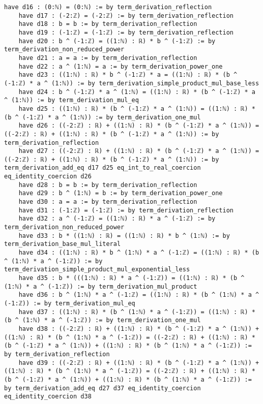 \documentclass{article}
\begin{document}
\begin{tcolorbox}[colback=white!10, width=\linewidth]
\begin{lstlisting}[language=Lean4]
    have d16 : (0:ℕ) = (0:ℕ) := by term_derivation_reflection
    have d17 : (-2:ℤ) = (-2:ℤ) := by term_derivation_reflection
    have d18 : b = b := by term_derivation_reflection
    have d19 : (-1:ℤ) = (-1:ℤ) := by term_derivation_reflection
    have d20 : b ^ (-1:ℤ) = ((1:ℕ) : ℝ) * b ^ (-1:ℤ) := by term_derivation_non_reduced_power
    have d21 : a = a := by term_derivation_reflection
    have d22 : a ^ (1:ℕ) = a := by term_derivation_power_one
    have d23 : ((1:ℕ) : ℝ) * b ^ (-1:ℤ) * a = ((1:ℕ) : ℝ) * (b ^ (-1:ℤ) * a ^ (1:ℕ)) := by term_derivation_simple_product_mul_base_less
    have d24 : b ^ (-1:ℤ) * a ^ (1:ℕ) = ((1:ℕ) : ℝ) * (b ^ (-1:ℤ) * a ^ (1:ℕ)) := by term_derivation_mul_eq
    have d25 : ((1:ℕ) : ℝ) * (b ^ (-1:ℤ) * a ^ (1:ℕ)) = ((1:ℕ) : ℝ) * (b ^ (-1:ℤ) * a ^ (1:ℕ)) := by term_derivation_one_mul
    have d26 : ((-2:ℤ) : ℝ) + ((1:ℕ) : ℝ) * (b ^ (-1:ℤ) * a ^ (1:ℕ)) = ((-2:ℤ) : ℝ) + ((1:ℕ) : ℝ) * (b ^ (-1:ℤ) * a ^ (1:ℕ)) := by term_derivation_reflection
    have d27 : ((-2:ℤ) : ℝ) + ((1:ℕ) : ℝ) * (b ^ (-1:ℤ) * a ^ (1:ℕ)) = ((-2:ℤ) : ℝ) + ((1:ℕ) : ℝ) * (b ^ (-1:ℤ) * a ^ (1:ℕ)) := by term_derivation_add_eq d17 d25 eq_int_to_real_coercion eq_identity_coercion d26
    have d28 : b = b := by term_derivation_reflection
    have d29 : b ^ (1:ℕ) = b := by term_derivation_power_one
    have d30 : a = a := by term_derivation_reflection
    have d31 : (-1:ℤ) = (-1:ℤ) := by term_derivation_reflection
    have d32 : a ^ (-1:ℤ) = ((1:ℕ) : ℝ) * a ^ (-1:ℤ) := by term_derivation_non_reduced_power
    have d33 : b * ((1:ℕ) : ℝ) = ((1:ℕ) : ℝ) * b ^ (1:ℕ) := by term_derivation_base_mul_literal
    have d34 : ((1:ℕ) : ℝ) * b ^ (1:ℕ) * a ^ (-1:ℤ) = ((1:ℕ) : ℝ) * (b ^ (1:ℕ) * a ^ (-1:ℤ)) := by term_derivation_simple_product_mul_exponential_less
    have d35 : b * (((1:ℕ) : ℝ) * a ^ (-1:ℤ)) = ((1:ℕ) : ℝ) * (b ^ (1:ℕ) * a ^ (-1:ℤ)) := by term_derivation_mul_product
    have d36 : b ^ (1:ℕ) * a ^ (-1:ℤ) = ((1:ℕ) : ℝ) * (b ^ (1:ℕ) * a ^ (-1:ℤ)) := by term_derivation_mul_eq
    have d37 : ((1:ℕ) : ℝ) * (b ^ (1:ℕ) * a ^ (-1:ℤ)) = ((1:ℕ) : ℝ) * (b ^ (1:ℕ) * a ^ (-1:ℤ)) := by term_derivation_one_mul
    have d38 : ((-2:ℤ) : ℝ) + ((1:ℕ) : ℝ) * (b ^ (-1:ℤ) * a ^ (1:ℕ)) + ((1:ℕ) : ℝ) * (b ^ (1:ℕ) * a ^ (-1:ℤ)) = ((-2:ℤ) : ℝ) + ((1:ℕ) : ℝ) * (b ^ (-1:ℤ) * a ^ (1:ℕ)) + ((1:ℕ) : ℝ) * (b ^ (1:ℕ) * a ^ (-1:ℤ)) := by term_derivation_reflection
    have d39 : ((-2:ℤ) : ℝ) + ((1:ℕ) : ℝ) * (b ^ (-1:ℤ) * a ^ (1:ℕ)) + ((1:ℕ) : ℝ) * (b ^ (1:ℕ) * a ^ (-1:ℤ)) = ((-2:ℤ) : ℝ) + ((1:ℕ) : ℝ) * (b ^ (-1:ℤ) * a ^ (1:ℕ)) + ((1:ℕ) : ℝ) * (b ^ (1:ℕ) * a ^ (-1:ℤ)) := by term_derivation_add_eq d27 d37 eq_identity_coercion eq_identity_coercion d38

\end{lstlisting}
\end{tcolorbox}
\end{document}
